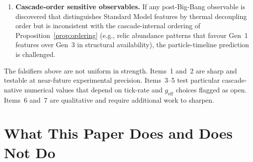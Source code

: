 \documentclass[12pt,a4paper]{article}
\begin{document}
\begin{enumerate}[leftmargin=*,nosep]
\item \textbf{Cascade-order sensitive observables.} If any post-Big-Bang
observable is discovered that distinguishes Standard Model features by
thermal decoupling order but is inconsistent with the cascade-internal
ordering of Proposition~\ref{prop:ordering} (e.g., relic abundance patterns
that favour Gen~1 features over Gen~3 in structural availability), the
particle-timeline prediction is challenged.

\end{enumerate}

The falsifiers above are not uniform in strength. Items~1 and~2 are sharp
and testable at near-future experimental precision. Items~3--5 test
particular cascade-native numerical values that depend on tick-rate and
$g_{\mathrm{eff}}$ choices flagged as open. Items~6 and~7 are qualitative and
require additional work to sharpen.

\section{What This Paper Does and Does Not Do}\label{sec:what-this-paper-does-and-does-not-do}
\end{document}
